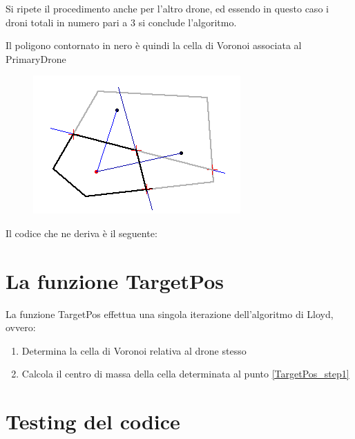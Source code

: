 \documentclass[11pt,a4paper]{report}
\newcommand{\modelicaclass}[1]{
	
}
\newcommand{\name}[1]{{\ttfamily #1}}
\begin{document}
Si ripete il procedimento anche per l'altro drone, ed essendo in questo caso i droni totali in numero pari a 3 si conclude l'algoritmo.

Il poligono contornato in nero è quindi la cella di Voronoi associata al \name{PrimaryDrone}

\begin{figure}[H]
\centering
\includegraphics[scale=0.7]{voronoi4.png}
\end{figure}

Il codice che ne deriva è il seguente:

\modelicaclass{VoronoiCell.mo}

\section{La funzione \name{TargetPos}}

\label{TargetPos}

La funzione \name{TargetPos} effettua una singola iterazione dell'algoritmo di Lloyd, ovvero:

\begin{enumerate}
	\item \label{TargetPos_step1} Determina la cella di Voronoi relativa al drone stesso
	\item Calcola il centro di massa della cella determinata al punto \ref{TargetPos_step1}
\end{enumerate}


\begin{figure}[H]
\modelicaclass{TargetPos.mo}
\end{figure}

\section{Testing del codice}

\label{testing}
\end{document}
